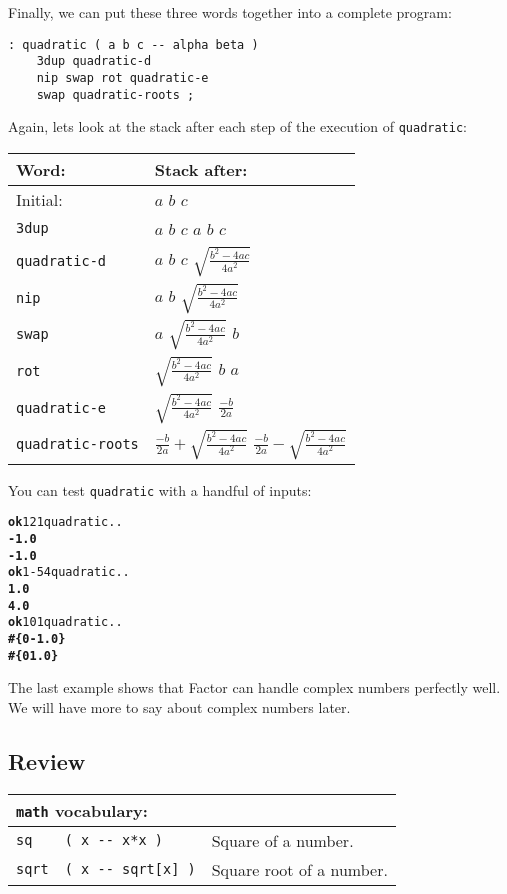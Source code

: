 \documentclass[english]{book}
\newcommand{\wordtable}[1]{{
\begin{tabularx}{12cm}{|l l X|}
#1
\hline
\end{tabularx}}}
\newcommand{\tabvocab}[1]{
\hline
\multicolumn{3}{|l|}{
\rule[-2mm]{0mm}{6mm}
\texttt{#1} vocabulary:}
\\
\hline
}
\begin{document}
Finally, we can put these three words together into a complete program:

\begin{verbatim}
: quadratic ( a b c -- alpha beta )
    3dup quadratic-d
    nip swap rot quadratic-e
    swap quadratic-roots ;
\end{verbatim}

Again, lets look at the stack after each step of the execution of \texttt{quadratic}:

\begin{tabular}{|l|l|}
\hline
Word:&Stack after:\\
\hline
Initial:&$a$ $b$ $c$\\
\hline
\texttt{3dup}&$a$ $b$ $c$ $a$ $b$ $c$\\
\hline
\texttt{quadratic-d}&$a$ $b$ $c$ $\sqrt{\frac{b^2-4ac}{4a^2}}$\\
\hline
\texttt{nip}&$a$ $b$ $\sqrt{\frac{b^2-4ac}{4a^2}}$\\
\hline
\texttt{swap}&$a$ $\sqrt{\frac{b^2-4ac}{4a^2}}$ $b$ \\
\hline
\texttt{rot}&$\sqrt{\frac{b^2-4ac}{4a^2}}$ $b$ $a$ \\
\hline
\texttt{quadratic-e}&$\sqrt{\frac{b^2-4ac}{4a^2}}$ $\frac{-b}{2a}$\\
\hline
\texttt{quadratic-roots}&$\frac{-b}{2a}+\sqrt{\frac{b^2-4ac}{4a^2}}$ $\frac{-b}{2a}-\sqrt{\frac{b^2-4ac}{4a^2}}$\\
\hline
\end{tabular}

You can test \texttt{quadratic} with a handful of inputs:

\begin{alltt}
\textbf{ok} 1 2 1 quadratic . .
\textbf{-1.0}
\textbf{-1.0}
\textbf{ok} 1 -5 4 quadratic . .
\textbf{1.0}
\textbf{4.0}
\textbf{ok} 1 0 1 quadratic . .
\textbf{#\{ 0 -1.0 \}
#\{ 0 1.0 \}}
\end{alltt}

The last example shows that Factor can handle complex numbers perfectly well. We will have more to say about complex numbers later.

\subsection*{Review}

\wordtable{
\tabvocab{math}
\texttt{sq}&
\texttt{( x -{}- x*x )}&
Square of a number.\\
\texttt{sqrt}&
\texttt{( x -{}- sqrt[x] )}&
Square root of a number.\\
}
\end{document}
